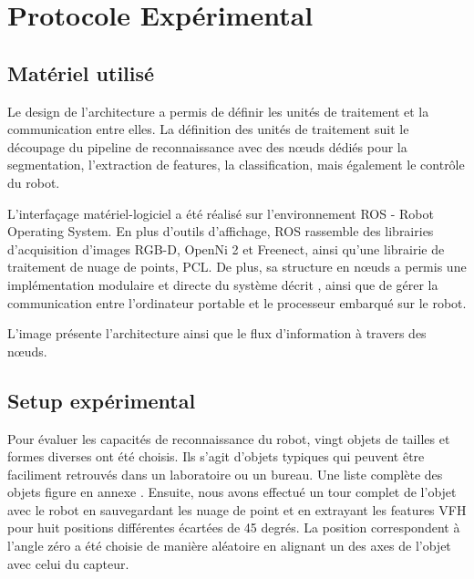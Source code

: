 \chapter {Protocole Expérimental}


\section{Matériel utilisé}

Le design de l'architecture a permis de définir les unités de traitement et la communication entre elles. La définition des unités de traitement suit le découpage du pipeline de reconnaissance avec des nœuds dédiés pour la segmentation, l'extraction de features, la classification, mais également le contrôle du robot.

L'interfaçage matériel-logiciel a été réalisé sur l'environnement ROS - Robot Operating System. En plus d'outils d'affichage, ROS rassemble des librairies d'acquisition d'images RGB-D, OpenNi 2 et Freenect, ainsi qu'une librairie de traitement de nuage de points, PCL.
De plus, sa structure en nœuds a permis une implémentation modulaire et directe du système décrit , ainsi que de gérer la communication entre l'ordinateur portable et le processeur embarqué sur le robot.

L'image \celine{ \ref{}} présente l'architecture ainsi que le flux d'information à travers des nœuds.

\section{Setup expérimental}
Pour évaluer les capacités de reconnaissance du robot, vingt objets de tailles et formes diverses ont été choisis. Ils s'agit d'objets typiques qui peuvent être faciliment retrouvés dans un laboratoire ou un bureau. Une liste complète des objets figure en annexe \celine{\ref{}}. Ensuite, nous avons effectué un tour complet de l'objet avec le robot en sauvegardant les nuage de point et en extrayant les features VFH pour huit positions différentes écartées de 45 degrés. La position correspondent à l'angle zéro a été choisie de manière aléatoire en alignant un des axes de l'objet avec celui du capteur. 

\begin{figure}[H]
	\caption{}
	\label{fig:setup_expe}
\end{figure}

